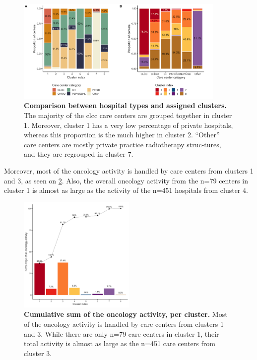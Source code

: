 \begin{figure}[H]
    \includegraphics[width=0.9\textwidth]{images/camion/supplemental/sup_fig2_categories_per_cluster.png}
    \centering
    \caption{ \textbf{Comparison between hospital types and assigned clusters.}
        The majority of the \ac{clcc} care centers are grouped together in
        cluster 1. Moreover, cluster 1 has a very low percentage of private
        hospitals, whereas this proportion is the much higher in cluster 2.
        “Other” care centers are mostly private practice radiotherapy
        struc-tures, and they are regrouped in cluster 7. }
    \label{fig:clustering-categories}
\end{figure}

Moreover, most of the oncology activity is handled by care centers from clusters
1 and 3, as seen on \cref{fig:clustering-cumulative}. Also, the overall oncology
activity from the n=79 centers in cluster 1 is almost as large as the activity
of the n=451 hospitals from cluster 4.

\begin{figure}[H]
    \includegraphics[width=0.5\textwidth]{images/camion/supplemental/sup_fig3_nb_stays_per_cluster.png}
    \centering
    \caption{ \textbf{Cumulative sum of the oncology activity, per cluster.}
        Most of the oncology activity is handled by care centers from clusters 1
        and 3. While there are only n=79 care centers in cluster 1, their total
        activity is almost as large as the n=451 care centers from cluster 3. }
    \label{fig:clustering-cumulative}
\end{figure}

